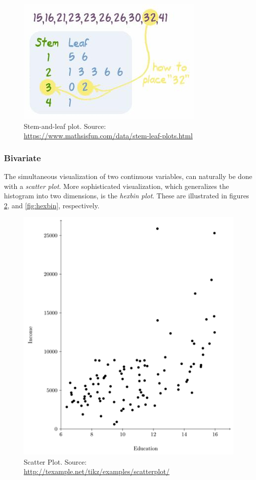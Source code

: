 \documentclass[12pt,a4paper]{report}
\begin{document}
\begin{figure}[h]
\centering
\includegraphics[height=0.3\textheight]{art/stem_and_leaf}
\caption[Stem and Leaf Pot]{Stem-and-leaf plot. Source: \url{https://www.mathsisfun.com/data/stem-leaf-plots.html}}
\label{fig:stem_and_leaf}
\end{figure}




\subsubsection{Bivariate}
The simultaneous visualization of two continuous variables, can naturally be done with a \emph{scatter plot}.
More sophisticated visualization, which generalizes the histogram into two dimensions, is the \emph{hexbin plot}.  
These are illustrated in figures \ref{fig:scatterplot}, and \ref{fig:hexbin}, respectively. 


\begin{figure}[h]
\centering
\includegraphics[height=0.3\textheight]{art/scatterplot}
\caption[Scatter Plot]{Scatter Plot. Source: \url{http://texample.net/tikz/examples/scatterplot/}}
\label{fig:scatterplot}
\end{figure}
\end{document}
